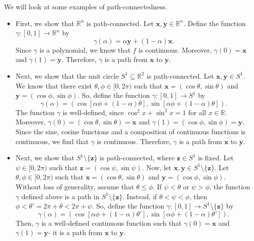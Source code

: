 \documentclass[a4paper, openany]{memoir}
\theoremstyle{definition}
\theoremstyle{plain}
\begin{document}
We will look at some examples of path-connectedness.
\begin{itemize}
    \item First, we show that $\mathbb{R}^n$ is path-connected. Let $\bm{x}, \bm{y} \in \mathbb{R}^n$. Define the function $\gamma: [0, 1] \to \mathbb{R}^n$ by
    \[\gamma(\alpha) = \alpha \bm{y} + (1 - \alpha) \bm{x}.\]
    Since $\gamma$ is a polynomial, we know that $f$ is continuous. Moreover, $\gamma(0) = \bm{x}$ and $\gamma(1) = \bm{y}$. Therefore, $\gamma$ is a path from $\bm{x}$ to $\bm{y}$.
    
    \item Next, we show that the unit circle $S^1 \subseteq \mathbb{R}^2$ is path-connected. Let $\bm{x}, \bm{y} \in S^1$. We know that there exist $\theta, \phi \in [0, 2\pi)$ such that $\bm{x} = (\cos \theta, \sin \theta)$ and $\bm{y} = (\cos \phi, \sin \phi)$. So, define the function $\gamma: [0, 1] \to S^1$ by
    \[\gamma(\alpha) = (\cos [\alpha \phi + (1 - \alpha) \theta], \sin [\alpha \phi + (1 - \alpha) \theta]).\]
    The function $\gamma$ is well-defined, since $\cos^2 x + \sin^2 x = 1$ for all $x \in \mathbb{R}$. Moreover, $\gamma(0) = (\cos \theta, \sin \theta) = \bm{x}$ and $\gamma(1) = (\cos \phi, \sin \phi) = \bm{y}$. Since the sine, cosine functions and a composition of continuous functions is continuous, we find that $\gamma$ is continuous. Therefore, $\gamma$ is a path from $\bm{x}$ to $\bm{y}$.
    
    \item Next, we show that $S^1 \setminus \{\bm{z}\}$ is path-connected, where $\bm{z} \in S^1$ is fixed. Let $\psi \in [0, 2\pi)$ such that $\bm{z} = (\cos \psi, \sin \psi)$. Now, let $\bm{x}, \bm{y} \in S^1 \setminus \{\bm{z}\}$. Let $\theta, \phi \in [0, 2\pi)$ such that $\bm{x} = (\cos \theta, \sin \theta)$ and $\bm{y} = (\cos \phi, \sin \phi)$. Without loss of generality, assume that $\theta \leqslant \phi$. If $\psi < \theta$ or $\psi > \phi$, the function $\gamma$ defined above is a path in $S^1 \setminus \{\bm{z}\}$. Instead, if $\theta < \psi < \phi$, then $\phi < \theta' = 2\pi + \theta < 2\pi + \psi$. So, define the function $\gamma: [0, 1] \to S^1 \setminus \{\bm{z}\}$ by
    \[\gamma(\alpha) = (\cos [\alpha \phi + (1 - \alpha) \theta'], \sin [\alpha \phi + (1 - \alpha) \theta']).\]
    Then, $\gamma$ is a well-defined continuous function such that $\gamma(0) = \bm{x}$ and $\gamma(1) = \bm{y}$- it is a path from $\bm{x}$ to $\bm{y}$.
    
\end{itemize}
\end{document}
